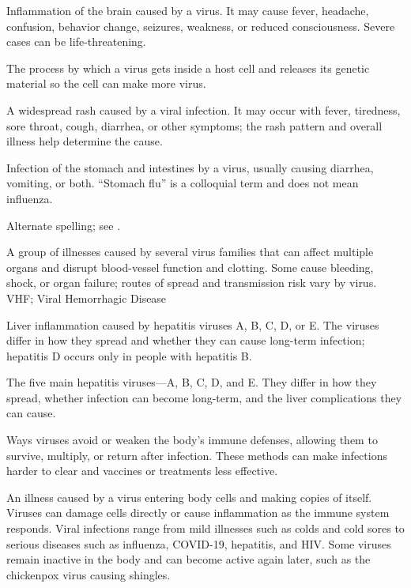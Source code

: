  Inflammation of the brain caused by a virus. It may cause fever, headache, confusion, behavior change, seizures, weakness, or reduced consciousness. Severe cases can be life-threatening.

 The process by which a virus gets inside a host cell and releases its genetic material so the cell can make more virus.

 A widespread rash caused by a viral infection. It may occur with fever, tiredness, sore throat, cough, diarrhea, or other symptoms; the rash pattern and overall illness help determine the cause.

 Infection of the stomach and intestines by a virus, usually causing diarrhea, vomiting, or both. “Stomach flu” is a colloquial term and does not mean influenza.

 Alternate spelling; see .

 A group of illnesses caused by several virus families that can affect multiple organs and disrupt blood-vessel function and clotting. Some cause bleeding, shock, or organ failure; routes of spread and transmission risk vary by virus.
\synonyms
VHF; Viral Hemorrhagic Disease

 Liver inflammation caused by hepatitis viruses A, B, C, D, or E. The viruses differ in how they spread and whether they can cause long-term infection; hepatitis D occurs only in people with hepatitis B.

\synonyms

 The five main hepatitis viruses—A, B, C, D, and E. They differ in how they spread, whether infection can become long-term, and the liver complications they can cause.

 Ways viruses avoid or weaken the body’s immune defenses, allowing them to survive, multiply, or return after infection. These methods can make infections harder to clear and vaccines or treatments less effective.

 An illness caused by a virus entering body cells and making copies of itself. Viruses can damage cells directly or cause inflammation as the immune system responds. Viral infections range from mild illnesses such as colds and cold sores to serious diseases such as influenza, COVID-19, hepatitis, and HIV. Some viruses remain inactive in the body and can become active again later, such as the chickenpox virus causing shingles.

